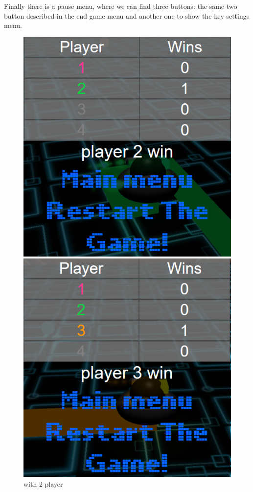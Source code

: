 \documentclass[11pt]{article}
\begin{document}
	Finally there is a pause menu, where we can find three buttons: the same two button described in the end game menu and another one to show the key settings menu.
	
	 \begin{figure}
	 	\centering
	 	\begin{minipage}[b]{0.25\linewidth}
	 		\includegraphics[width=\linewidth]{endGameMenu2}
	 		\caption{with 2 player}
	 		\label{fig:endGameMenu2}
	 	\end{minipage}
	 	\begin{minipage}[b]{0.25\linewidth}
	 		\includegraphics[width=\linewidth]{endGameMenu3}

\end{minipage}
\end{figure}
\end{document}
